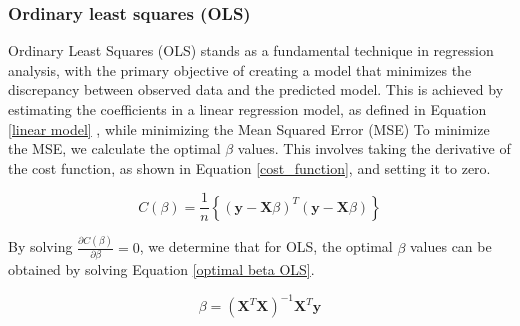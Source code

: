 \subsubsection{Ordinary least squares (OLS)}
\noindent Ordinary Least Squares (OLS) stands as a fundamental technique in 
regression analysis, with the primary objective of creating a model that 
minimizes the discrepancy between observed data and the predicted model. 
This is achieved by estimating the coefficients in a linear regression model, 
as defined in Equation \eqref{linear model}
, while minimizing the Mean Squared 
Error (MSE) %
To minimize the MSE, we calculate the optimal $\beta$ values. This involves 
taking the derivative of the cost function, as shown in Equation \eqref{cost_function}, 
and setting it to zero.

\begin{equation}
C(\beta) = \frac{1}{n} \left\lbrace ( \textbf{y} - \textbf{X}\beta )^T (\textbf{y} - \textbf{X}\beta)\right\rbrace \label{cost_function}
\end{equation}

\noindent By solving $\frac{\partial C(\beta)}{\partial \beta} = 0$, we determine that 
for OLS, the optimal $\beta$ values can be obtained by solving Equation
\eqref{optimal beta OLS}.

\begin{equation}
\beta = (\textbf{X}^T \textbf{X})^{-1}\textbf{X}^T \textbf{y} \label{optimal beta OLS}
\end{equation}

